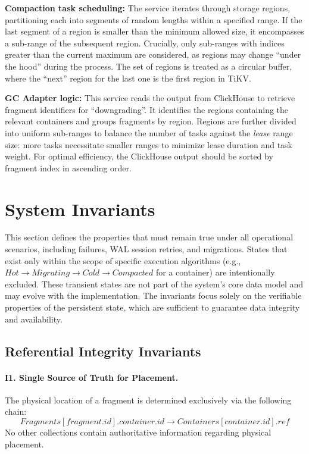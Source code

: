 \documentclass[a4paper,12pt]{article}
\begin{document}
    \textbf{Compaction task scheduling:} The service iterates through storage regions, partitioning each into segments of random lengths within a specified range. If the last segment of a region is smaller than the minimum allowed size, it encompasses a sub-range of the subsequent region. Crucially, only sub-ranges with indices greater than the current maximum are considered, as regions may change \enquote{under the hood} during the process. The set of regions is treated as a circular buffer, where the \enquote{next} region for the last one is the first region in TiKV.

    \textbf{GC Adapter logic:} This service reads the output from ClickHouse to retrieve fragment identifiers for \enquote{downgrading}. It identifies the regions containing the relevant containers and groups fragments by region. Regions are further divided into uniform sub-ranges to balance the number of tasks against the \textit{lease} range size: more tasks necessitate smaller ranges to minimize lease duration and task weight. For optimal efficiency, the ClickHouse output should be sorted by fragment index in ascending order.


    \newpage


    \section{System Invariants}

    This section defines the properties that must remain true under all operational scenarios, including failures, WAL session retries, and migrations. States that exist only within the scope of specific execution algorithms (e.g., $Hot \rightarrow Migrating \rightarrow Cold \rightarrow Compacted$ for a container) are intentionally excluded. These transient states are not part of the system's core data model and may evolve with the implementation. The invariants focus solely on the verifiable properties of the persistent state, which are sufficient to guarantee data integrity and availability.

    \subsection{Referential Integrity Invariants}

    \paragraph{I1. Single Source of Truth for Placement.}
    The physical location of a fragment is determined exclusively via the following chain:
    \[
        Fragments[fragment.id].container.id \rightarrow Containers[container.id].ref
    \]
    No other collections contain authoritative information regarding physical placement.
\end{document}
